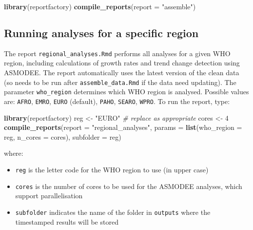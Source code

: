 \documentclass[]{book}
\newenvironment{Shaded}{\begin{snugshade}}{\end{snugshade}}
\newcommand{\CommentTok}[1]{\textcolor[rgb]{0.56,0.35,0.01}{\textit{#1}}}
\newcommand{\DataTypeTok}[1]{\textcolor[rgb]{0.13,0.29,0.53}{#1}}
\newcommand{\DecValTok}[1]{\textcolor[rgb]{0.00,0.00,0.81}{#1}}
\newcommand{\KeywordTok}[1]{\textcolor[rgb]{0.13,0.29,0.53}{\textbf{#1}}}
\newcommand{\NormalTok}[1]{#1}
\newcommand{\StringTok}[1]{\textcolor[rgb]{0.31,0.60,0.02}{#1}}
\providecommand{\tightlist}{%
  \setlength{\itemsep}{0pt}\setlength{\parskip}{0pt}}
\begin{document}
\begin{Shaded}
\begin{Highlighting}[]

\KeywordTok{library}\NormalTok{(reportfactory)}
\KeywordTok{compile_reports}\NormalTok{(}\DataTypeTok{report =} \StringTok{"assemble"}\NormalTok{)}
\end{Highlighting}
\end{Shaded}

\hypertarget{running-analyses-for-a-specific-region}{%
\subsection{Running analyses for a specific region}\label{running-analyses-for-a-specific-region}}

The report \texttt{regional\_analyses.Rmd} performs all analyses for a given WHO region,
including calculations of growth rates and trend change detection using
ASMODEE. The report automatically uses the latest version of the clean data (so
needs to be run after \texttt{assemble\_data.Rmd} if the data need updating). The
parameter \texttt{who\_region} determines which WHO region is analysed. Possible values
are: \texttt{AFRO}, \texttt{EMRO}, \texttt{EURO} (default), \texttt{PAHO}, \texttt{SEARO}, \texttt{WPRO}. To run the
report, type:

\begin{Shaded}
\begin{Highlighting}[]

\KeywordTok{library}\NormalTok{(reportfactory)}
\NormalTok{reg <-}\StringTok{ "EURO"} \CommentTok{# replace as appropriate}
\NormalTok{cores <-}\StringTok{ }\DecValTok{4}
\KeywordTok{compile_reports}\NormalTok{(}\DataTypeTok{report =} \StringTok{"regional_analyses"}\NormalTok{,}
                \DataTypeTok{params =} \KeywordTok{list}\NormalTok{(}\DataTypeTok{who_region =}\NormalTok{ reg, }\DataTypeTok{n_cores =}\NormalTok{ cores),}
                \DataTypeTok{subfolder =}\NormalTok{ reg)}
\end{Highlighting}
\end{Shaded}

where:

\begin{itemize}
\tightlist
\item
  \texttt{reg} is the letter code for the WHO region to use (in upper case)
\item
  \texttt{cores} is the number of cores to be used for the ASMODEE analyses, which
  support parallelisation
\item
  \texttt{subfolder} indicates the name of the folder in \texttt{outputs} where the
  timestamped results will be stored
\end{itemize}
\end{document}

